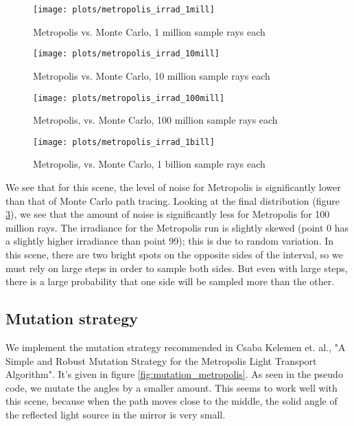 \begin{figure}[h]
    \centering
    \texttt{[image: plots/metropolis\_irrad\_1mill]}\\
    \caption{Metropolis vs. Monte Carlo, 1 million sample rays each}
    \label{fig:metropolis_irrad1}
\end{figure}

\begin{figure}
    \centering
    \texttt{[image: plots/metropolis\_irrad\_10mill]}\\
    \caption{Metropolis vs. Monte Carlo, 10 million sample rays each}
    \label{fig:metropolis_irrad10}
\end{figure}

\begin{figure}
    \centering
    \texttt{[image: plots/metropolis\_irrad\_100mill]}\\
    \caption{Metropolis, vs. Monte Carlo, 100 million sample rays each}
    \label{fig:metropolis_irrad100}
\end{figure}

\begin{figure}
    \centering
    \texttt{[image: plots/metropolis\_irrad\_1bill]}\\
    \caption{Metropolis, vs. Monte Carlo, 1 billion sample rays each}
    \label{fig:metropolis_irrad1000}
\end{figure}

We see that for this scene, the level of noise for Metropolis is significantly lower than that of Monte Carlo path tracing. Looking at the final distribution (figure \ref{fig:metropolis_irrad100}), we see that the amount of noise is significantly less for Metropolis for 100 million rays. The irradiance for the Metropolis run is slightly skewed (point 0 has a slightly higher irradiance than point 99); this is due to random variation. In this scene, there are two bright spots on the opposite sides of the interval, so we must rely on large steps in order to sample both sides. But even with large steps, there is a large probability that one side will be sampled more than the other.

\subsection*{Mutation strategy}
We implement the mutation strategy recommended in Csaba Kelemen et. al., "A Simple and Robust Mutation Strategy for the Metropolis Light Transport Algorithm". It's given in figure \ref{fig:mutation_metropolis}. As seen in the pseudo code, we mutate the angles by a smaller amount. This seems to work well with this scene, because when the path moves close to the middle, the solid angle of the reflected light source in the mirror is very small.

